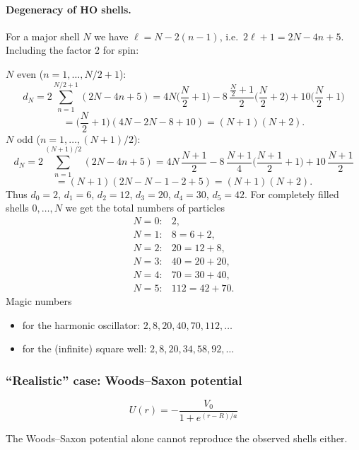 \documentclass[11pt,a4paper]{article}
\begin{document}
\paragraph{Degeneracy of HO shells.} For a major shell $N$ we have $\ell=N-2(n-1)$, i.e.\ $2\ell+1=2N-4n+5$. Including the factor 2 for spin:

$N$ even ($n=1,\dots,N/2+1$):
\[
d_N=2\sum_{n=1}^{N/2+1}(2N-4n+5)
=4N\Big(\frac N2+1\Big)-8\,\frac{\frac N2+1}{2}\Big(\frac N2+2\Big)+10\Big(\frac N2+1\Big)
\]
\[
=\Big(\frac N2+1\Big)(4N-2N-8+10)=(N+1)(N+2).
\]
$N$ odd ($n=1,\dots,(N+1)/2$):
\[
d_N=2\sum_{n=1}^{(N+1)/2}(2N-4n+5)
=4N\,\frac{N+1}{2}-8\,\frac{N+1}{4}\Big(\frac{N+1}{2}+1\Big)+10\,\frac{N+1}{2}
\]
\[
=(N+1)(2N-N-1-2+5)=(N+1)(N+2).
\]
Thus $d_0=2$, $d_1=6$, $d_2=12$, $d_3=20$, $d_4=30$, $d_5=42$. For completely filled shells $0,\dots,N$ we get the total numbers of particles
\[
\begin{array}{ll}
N=0: & 2,\\
N=1: & 8=6+2,\\
N=2: & 20=12+8,\\
N=3: & 40=20+20,\\
N=4: & 70=30+40,\\
N=5: & 112=42+70.
\end{array}
\]
Magic numbers
\begin{itemize}
\item for the harmonic oscillator: $2,8,20,40,70,112,\dots$
\item for the (infinite) square well: $2,8,20,34,58,92,\dots$
\end{itemize}

\subsubsection*{``Realistic'' case: Woods--Saxon potential}
\[
U(r)=-\frac{V_0}{1+e^{(r-R)/a}}
\]
\begin{center}
\end{center}
The Woods--Saxon potential alone cannot reproduce the observed shells either.
\end{document}
